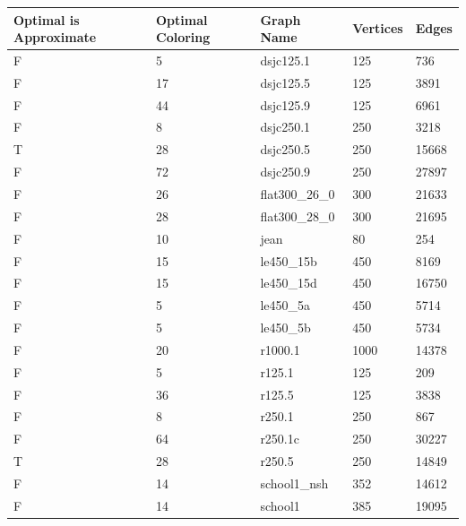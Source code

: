 \documentclass[runningheads]{llncs}
\begin{document}
\begin{longtable}{|l|l|l|l|l|}
\hline
\rowcolor[HTML]{F56B00} 
Optimal is Approximate & Optimal Coloring & Graph Name     & Vertices & Edges \\ \hline
\endhead
%
F          & 5                & dsjc125.1      & 125      & 736   \\ \hline
F          & 17               & dsjc125.5      & 125      & 3891  \\ \hline
F          & 44               & dsjc125.9      & 125      & 6961  \\ \hline
F          & 8                & dsjc250.1      & 250      & 3218  \\ \hline
T          & 28               & dsjc250.5      & 250      & 15668 \\ \hline
F          & 72               & dsjc250.9      & 250      & 27897 \\ \hline
F          & 26               & flat300\_26\_0 & 300      & 21633 \\ \hline
F          & 28               & flat300\_28\_0 & 300      & 21695 \\ \hline
F          & 10               & jean           & 80       & 254   \\ \hline
F          & 15               & le450\_15b     & 450      & 8169  \\ \hline
F          & 15               & le450\_15d     & 450      & 16750 \\ \hline
F          & 5                & le450\_5a      & 450      & 5714  \\ \hline
F          & 5                & le450\_5b      & 450      & 5734  \\ \hline
F          & 20               & r1000.1        & 1000     & 14378 \\ \hline
F          & 5                & r125.1         & 125      & 209   \\ \hline
F          & 36               & r125.5         & 125      & 3838  \\ \hline
F          & 8                & r250.1         & 250      & 867   \\ \hline
F          & 64               & r250.1c        & 250      & 30227 \\ \hline
T          & 28               & r250.5         & 250      & 14849 \\ \hline
F          & 14               & school1\_nsh   & 352      & 14612 \\ \hline
F          & 14               & school1        & 385      & 19095 \\ \hline
\end{longtable}
\end{document}
